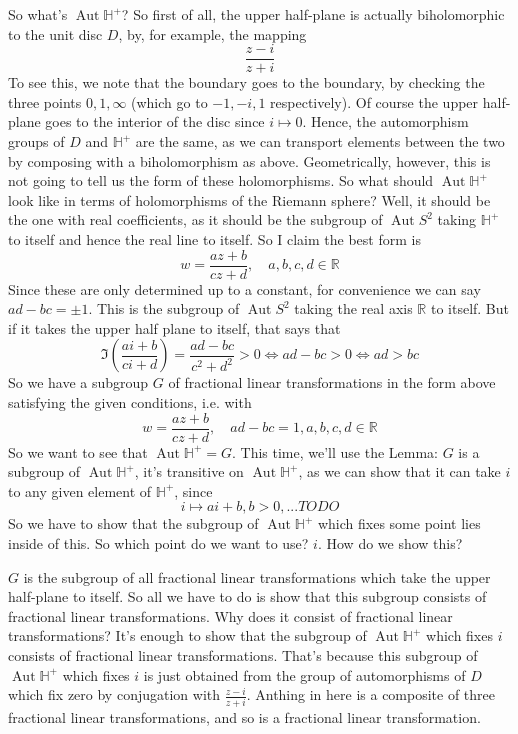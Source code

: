 \documentclass{article}
\newcommand{\mbb}[1]{\mathbb{#1}}
\DeclareMathOperator{\Aut}{Aut}
\begin{document}
So what's \(\Aut\mbb{H}^+\)? So first of all, the upper half-plane is actually biholomorphic to the unit disc \(D\), by, for example, the mapping
\[\frac{z - i}{z + i}\]
To see this, we note that the boundary goes to the boundary, by checking the three points \(0, 1, \infty\) (which go to \(-1, -i, 1\) respectively). Of course the upper half-plane goes to the interior of the disc since \(i \mapsto 0\). Hence, the automorphism groups of \(D\) and \(\mbb{H}^+\) are the same, as we can transport elements between the two by composing with a biholomorphism as above. Geometrically, however, this is not going to tell us the form of these holomorphisms. So what should \(\Aut\mbb{H}^+\) look like in terms of holomorphisms of the Riemann sphere? Well, it should be the one with real coefficients, as it should be the subgroup of \(\Aut S^2\) taking \(\mbb{H}^+\) to itself and hence the real line to itself. So I claim the best form is
\[w = \frac{az + b}{cz + d}, \quad a, b, c, d \in \mbb{R}\]
Since these are only determined up to a constant, for convenience we can say \(ad - bc = \pm 1\). This is the subgroup of \(\Aut S^2\) taking the real axis \(\mbb{R}\) to itself. But if it takes the upper half plane to itself, that says that
\[\Im\left(\frac{ai + b}{ci + d}\right) = \frac{ad - bc}{c^2 + d^2} > 0 \iff ad - bc > 0 \iff ad > bc\]
So we have a subgroup \(G\) of fractional linear transformations in the form above satisfying the given conditions, i.e. with
\[w = \frac{az + b}{cz + d}, \quad ad - bc = 1, a, b, c, d \in \mbb{R}\]
So we want to see that \(\Aut\mbb{H}^+ = G\). This time, we'll use the Lemma: \(G\) is a subgroup of \(\Aut\mbb{H}^+\), it's transitive on \(\Aut\mbb{H}^+\), as we can show that it can take \(i\) to any given element of \(\mbb{H}^+\), since
\[i \mapsto ai + b, b > 0, ... TODO\]
So we have to show that the subgroup of \(\Aut\mbb{H}^+\) which fixes some point lies inside of this. So which point do we want to use? \(i\). How do we show this?

\(G\) is the subgroup of all fractional linear transformations which take the upper half-plane to itself. So all we have to do is show that this subgroup consists of fractional linear transformations. Why does it consist of fractional linear transformations? It's enough to show that the subgroup of \(\Aut\mbb{H}^+\) which fixes \(i\) consists of fractional linear transformations. That's because this subgroup of \(\Aut\mbb{H}^+\) which fixes \(i\) is just obtained from the group of automorphisms of \(D\) which fix zero by conjugation with \(\frac{z - i}{z + i}\). Anthing in here is a composite of three fractional linear transformations, and so is a fractional linear transformation.
\end{document}
